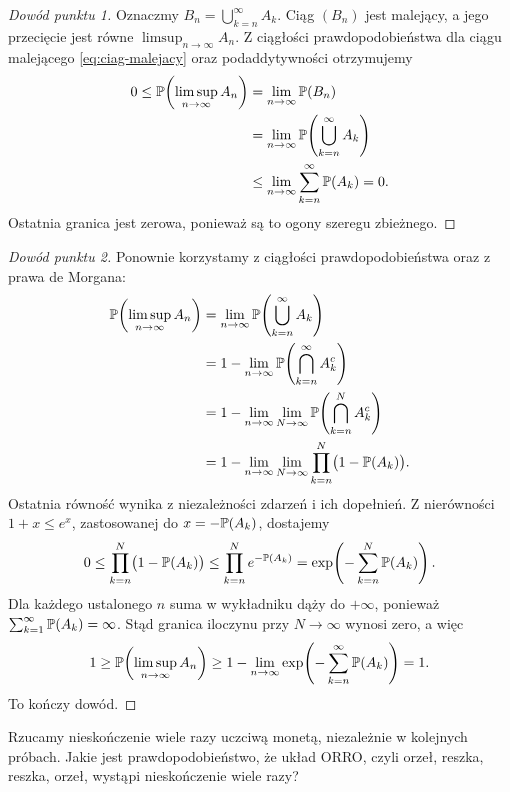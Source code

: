 \begin{proof}[Dowód punktu 1]
Oznaczmy $B_n=\bigcup_{k=n}^{\infty}A_k$. Ciąg $(B_n)$ jest malejący,
a jego przecięcie jest równe $\limsup_{n\to\infty}A_n$.
Z ciągłości prawdopodobieństwa dla ciągu malejącego
\eqref{eq:ciag-malejacy} oraz podaddytywności otrzymujemy
\begin{align*}
  0\leq\mathbb{P}\!\left(\limsup_{n\to\infty}A_n\right)
    &=\lim_{n\to\infty}\mathbb{P}(B_n)\\
    &=\lim_{n\to\infty}\mathbb{P}\!\left(\bigcup_{k=n}^{\infty}A_k\right)\\
    &\leq\lim_{n\to\infty}\sum_{k=n}^{\infty}\mathbb{P}(A_k)=0.
\end{align*}
Ostatnia granica jest zerowa, ponieważ są to ogony szeregu zbieżnego.
\end{proof}

\begin{proof}[Dowód punktu 2]
Ponownie korzystamy z ciągłości prawdopodobieństwa oraz z prawa de Morgana:
\begin{align*}
  \mathbb{P}\!\left(\limsup_{n\to\infty}A_n\right)
    &=\lim_{n\to\infty}\mathbb{P}\!\left(\bigcup_{k=n}^{\infty}A_k\right)\\
    &=1-\lim_{n\to\infty}\mathbb{P}\!\left(\bigcap_{k=n}^{\infty}A_k^c\right)\\
    &=1-\lim_{n\to\infty}\lim_{N\to\infty}
      \mathbb{P}\!\left(\bigcap_{k=n}^{N}A_k^c\right)\\
    &=1-\lim_{n\to\infty}\lim_{N\to\infty}
      \prod_{k=n}^{N}\bigl(1-\mathbb{P}(A_k)\bigr).
\end{align*}
Ostatnia równość wynika z niezależności zdarzeń i ich dopełnień.
Z nierówności $1+x\leq e^x$, zastosowanej do $x=-\mathbb{P}(A_k)$, dostajemy
\[
  0\leq\prod_{k=n}^{N}\bigl(1-\mathbb{P}(A_k)\bigr)
    \leq\prod_{k=n}^{N}e^{-\mathbb{P}(A_k)}
    =\exp\!\left(-\sum_{k=n}^{N}\mathbb{P}(A_k)\right).
\]
Dla każdego ustalonego $n$ suma w wykładniku dąży do $+\infty$,
ponieważ $\sum_{k=1}^{\infty}\mathbb{P}(A_k)=\infty$.
Stąd granica iloczynu przy $N\to\infty$ wynosi zero, a więc
\[
  1\geq\mathbb{P}\!\left(\limsup_{n\to\infty}A_n\right)
    \geq1-\lim_{n\to\infty}
      \exp\!\left(-\sum_{k=n}^{\infty}\mathbb{P}(A_k)\right)=1.
\]
To kończy dowód.
\end{proof}


\begin{przyklad}
\label{przykl:orro}
Rzucamy nieskończenie wiele razy uczciwą monetą, niezależnie w kolejnych
próbach. Jakie jest prawdopodobieństwo, że układ ORRO, czyli orzeł,
reszka, reszka, orzeł, wystąpi nieskończenie wiele razy?
\end{przyklad}

